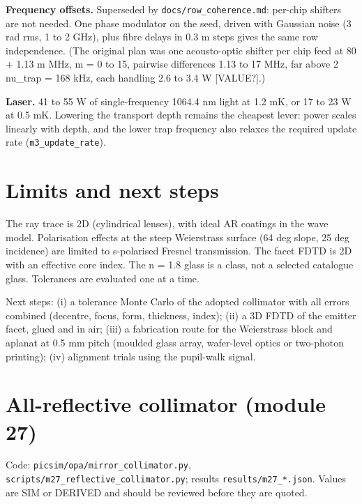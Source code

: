 \textbf{Frequency offsets.} Superseded by
\texttt{docs/row\_coherence.md}: per-chip shifters are not needed. One
phase modulator on the seed, driven with Gaussian noise (3 rad rms, 1 to
2 GHz), plus fibre delays in 0.3 m steps gives the same row
independence. (The original plan was one acousto-optic shifter per chip
feed at 80 + 1.13 m MHz, m = 0 to 15, pairwise differences 1.13 to 17
MHz, far above 2 nu\_trap = 168 kHz, each handling 2.6 to 3.4 W
{[}VALUE?{]}.)

\textbf{Laser.} 41 to 55 W of single-frequency 1064.4 nm light at 1.2
mK, or 17 to 23 W at 0.5 mK. Lowering the transport depth remains the
cheapest lever: power scales linearly with depth, and the lower trap
frequency also relaxes the required update rate
(\texttt{m3\_update\_rate}).

\hypertarget{9-limits-and-next-steps}{%
\section{Limits and next steps}\label{collimator-9-limits-and-next-steps}}

The ray trace is 2D (cylindrical lenses), with ideal AR coatings in the
wave model. Polarisation effects at the steep Weierstrass surface (64
deg slope, 25 deg incidence) are limited to s-polarised Fresnel
transmission. The facet FDTD is 2D with an effective core index. The n =
1.8 glass is a class, not a selected catalogue glass. Tolerances are
evaluated one at a time.

Next steps: (i) a tolerance Monte Carlo of the adopted collimator with
all errors combined (decentre, focus, form, thickness, index); (ii) a 3D
FDTD of the emitter facet, glued and in air; (iii) a fabrication route
for the Weierstrass block and aplanat at 0.5 mm pitch (moulded glass
array, wafer-level optics or two-photon printing); (iv) alignment trials
using the pupil-walk signal.

\hypertarget{10-all-reflective-collimator-module-27}{%
\section{All-reflective collimator (module
27)}\label{collimator-10-all-reflective-collimator-module-27}}

Code: \texttt{picsim/opa/mirror\_collimator.py},
\texttt{scripts/m27\_reflective\_collimator.py}; results
\texttt{results/m27\_*.json}. Values are SIM or DERIVED and should be
reviewed before they are quoted.

